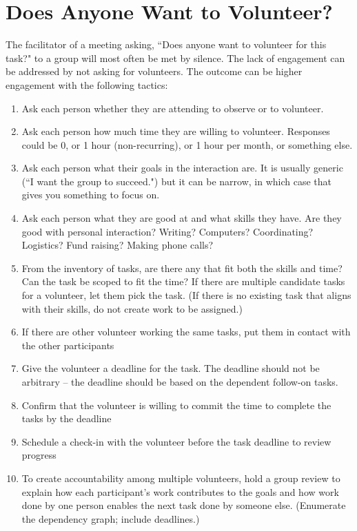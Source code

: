 \section{Does Anyone Want to Volunteer?}


The facilitator of a meeting asking, ``Does anyone want to volunteer for this task?" to a group will most often be met by silence. 
The lack of engagement can be addressed by not asking for volunteers. The outcome can be higher engagement with the following tactics:
\begin{enumerate}
    \item Ask each person whether they are attending to observe or to volunteer.
    \item Ask each person how much time they are willing to volunteer. Responses could be 0, or 1 hour (non-recurring), or 1 hour per month, or something else.
    \item Ask each person what their goals in the interaction are. It is usually generic (``I want the group to succeed.") but it can be narrow, in which case that gives you something to focus on.
    \item Ask each person what they are good at and what skills they have. Are they good with personal interaction? Writing? Computers? Coordinating? Logistics? Fund raising? Making phone calls?
    \item From the inventory of tasks, are there any that fit both the skills and time? Can the task be scoped to fit the time? If there are multiple candidate tasks for a volunteer, let them pick the task. (If there is no existing task that aligns with their skills, do not create work to be assigned.)
    \item If there are other volunteer working the same tasks, put them in contact with the other participants
    \item Give the volunteer a deadline for the task. The deadline should not be arbitrary -- the deadline should be based on the dependent follow-on tasks. 
    \item Confirm that the volunteer is willing to commit the time to complete the tasks by the deadline
    \item Schedule a check-in with the volunteer before the task deadline to review progress
    \item To create accountability among multiple volunteers, hold a group review to explain how each participant's work contributes to the goals and how work done by one person enables the next task done by someone else. (Enumerate the dependency graph; include deadlines.)
\end{enumerate}
